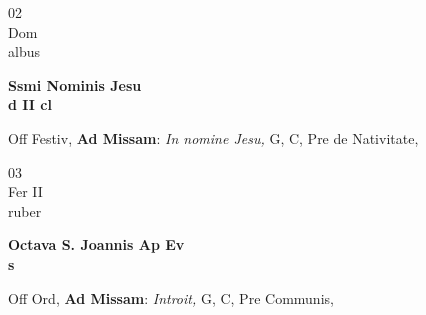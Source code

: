 \documentclass[10pt, openany]{book}
\begin{document}
        \begin{center}
            \begin{minipage}{3.5in}
                \vspace{2em}
                \begin{minipage}{0.5in}
                    {\Huge 02} \\
                    {\normalsize Dom} \\
                    {\normalsize albus}
                \end{minipage}
                \begin{minipage}{3.0in}
                    \textbf{ \large Ssmi Nominis Jesu \\
                    \textnormal{\normalsize d II cl}} \\ 
                \end{minipage}
                \begin{justify}Off Festiv, \textbf{Ad Missam}: \textit{In nomine Jesu,} G, C, Pre de Nativitate,  
                \end{justify}
            \end{minipage}
        \end{center}
    
        \begin{center}
            \begin{minipage}{3.5in}
                \vspace{2em}
                \begin{minipage}{0.5in}
                    {\Huge 03} \\
                    {\normalsize Fer II} \\
                    {\normalsize ruber}
                \end{minipage}
                \begin{minipage}{3.0in}
                    \textbf{ \large Octava S. Joannis Ap Ev \\
                    \textnormal{\normalsize s}} \\ 
                \end{minipage}
                \begin{justify}Off Ord, \textbf{Ad Missam}: \textit{Introit,} G, C, Pre Communis,  
                \end{justify}
            \end{minipage}
        \end{center}
    
\end{document}
